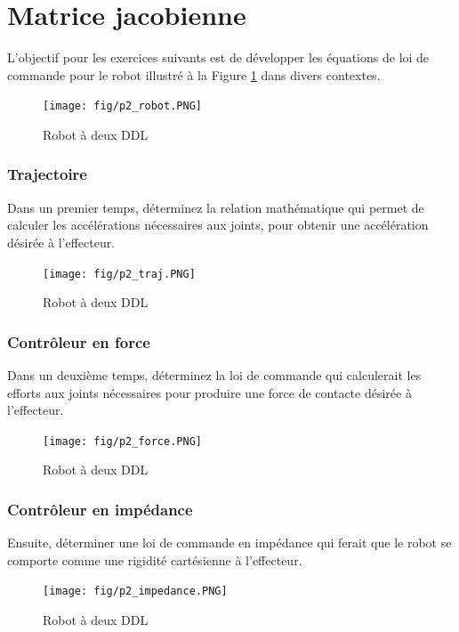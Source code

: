 \section{Matrice jacobienne}


L'objectif pour les exercices suivants est de développer les équations de loi de commande pour le robot illustré à la Figure \ref{fig:p2_robot} dans divers contextes.

\begin{figure}[H]
	\centering
		\texttt{[image: fig/p2\_robot.PNG]}
	\caption{Robot à deux DDL}
	\label{fig:p2_robot}
\end{figure}

\subsubsection{Trajectoire}

Dans un premier temps, déterminez la relation mathématique qui permet de calculer les accélérations nécessaires aux joints, pour obtenir une accélération désirée à l'effecteur. 
\begin{figure}[H]
	\centering
		\texttt{[image: fig/p2\_traj.PNG]}
	\caption{Robot à deux DDL}
	\label{fig:p2_traj}
\end{figure}

\subsubsection{Contrôleur en force}
Dans un deuxième temps, déterminez la loi de commande qui calculerait les efforts aux joints nécessaires pour produire une force de contacte désirée à l'effecteur.

\begin{figure}[H]
	\centering
		\texttt{[image: fig/p2\_force.PNG]}
	\caption{Robot à deux DDL}
	\label{fig:p2_force}
\end{figure}

\subsubsection{Contrôleur en impédance}
Ensuite, déterminer une loi de commande en impédance qui ferait que le robot se comporte comme une rigidité cartésienne à l'effecteur.

\begin{figure}[H]
	\centering
		\texttt{[image: fig/p2\_impedance.PNG]}
	\caption{Robot à deux DDL}
	\label{fig:p2_impedance}
\end{figure}

